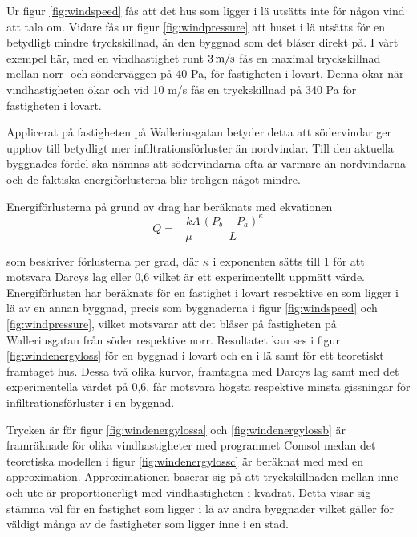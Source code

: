 Ur figur \ref{fig:windspeed} fås att det hus som ligger i lä utsätts inte för någon vind att tala om.
 Vidare fås ur figur \ref{fig:windpressure} att huset i lä utsätts för en betydligt mindre 
 tryckskillnad, än den byggnad som det blåser direkt på. I vårt exempel här, med en 
 vindhastighet runt $\unit[3]{m/s}$ fås en maximal tryckskillnad mellan norr- och sönderväggen 
 på 40 Pa, för fastigheten i lovart. Denna ökar när vindhastigheten ökar och vid 10 m/s fås en 
 tryckskillnad på 340 Pa för fastigheten i lovart. 

Applicerat på fastigheten på Walleriusgatan betyder detta att södervindar ger upphov till 
betydligt mer infiltrationsförluster än nordvindar. Till den aktuella byggnades fördel ska nämnas 
att södervindarna ofta är varmare än nordvindarna och de faktiska energiförlusterna blir 
troligen något mindre.


Energiförlusterna på grund av drag har beräknats med ekvationen
\begin{equation}
Q=\frac{-kA}{\mu} \frac{(P_b - P_a)^\kappa}{L} 
\end{equation}

som beskriver förlusterna per grad, där $\kappa$ i exponenten sätts till 1 för att motsvara
 Darcys lag eller 0,6 vilket är ett experimentellt uppmätt värde. Energiförlusten har beräknats
  för en fastighet i lovart respektive en som ligger i lä av en annan byggnad, precis som 
  byggnaderna i figur \ref{fig:windspeed} och \ref{fig:windpressure}, vilket motsvarar att det 
  blåser på fastigheten på Walleriusgatan från söder respektive norr. Resultatet kan ses i figur 
  \ref{fig:windenergyloss} för en byggnad i lovart och en i lä samt för ett teoretiskt framtaget hus. Dessa två olika kurvor, framtagna med Darcys lag samt med det experimentella värdet på 
  0,6, får motsvara högsta respektive minsta gissningar för infiltrationsförluster i en byggnad. 

Trycken är för figur \ref{fig:windenergylossa} och \ref{fig:windenergylossb} är framräknade för 
olika vindhastigheter med programmet Comsol medan det teoretiska modellen i figur 
\ref{fig:windenergylossc} är beräknat med med en approximation. Approximationen baserar sig
 på att tryckskillnaden mellan inne och ute är proportionerligt med vindhastigheten i kvadrat. 
 Detta visar sig stämma väl för en fastighet som ligger i lä av andra byggnader vilket gäller för 
 väldigt många av de fastigheter som ligger inne i en stad.

